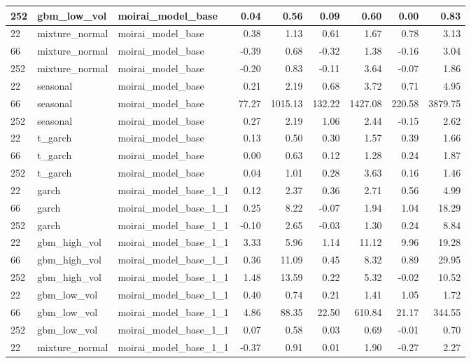 {\begin{tabular}{lllrrrrrr}
252 & gbm\_low\_vol & moirai\_model\_base & 0.04 & 0.56 & 0.09 & 0.60 & 0.00 & 0.83 \\
\midrule
22 & mixture\_normal & moirai\_model\_base & 0.38 & 1.13 & 0.61 & 1.67 & 0.78 & 3.13 \\
66 & mixture\_normal & moirai\_model\_base & -0.39 & 0.68 & -0.32 & 1.38 & -0.16 & 3.04 \\
252 & mixture\_normal & moirai\_model\_base & -0.20 & 0.83 & -0.11 & 3.64 & -0.07 & 1.86 \\
\midrule
22 & seasonal & moirai\_model\_base & 0.21 & 2.19 & 0.68 & 3.72 & 0.71 & 4.95 \\
66 & seasonal & moirai\_model\_base & 77.27 & 1015.13 & 132.22 & 1427.08 & 220.58 & 3879.75 \\
252 & seasonal & moirai\_model\_base & 0.27 & 2.19 & 1.06 & 2.44 & -0.15 & 2.62 \\
\midrule
22 & t\_garch & moirai\_model\_base & 0.13 & 0.50 & 0.30 & 1.57 & 0.39 & 1.66 \\
66 & t\_garch & moirai\_model\_base & 0.00 & 0.63 & 0.12 & 1.28 & 0.24 & 1.87 \\
252 & t\_garch & moirai\_model\_base & 0.04 & 1.01 & 0.28 & 3.63 & 0.16 & 1.46 \\
\midrule
22 & garch & moirai\_model\_base\_1\_1 & 0.12 & 2.37 & 0.36 & 2.71 & 0.56 & 4.99 \\
66 & garch & moirai\_model\_base\_1\_1 & 0.25 & 8.22 & -0.07 & 1.94 & 1.04 & 18.29 \\
252 & garch & moirai\_model\_base\_1\_1 & -0.10 & 2.65 & -0.03 & 1.30 & 0.24 & 8.84 \\
\midrule
22 & gbm\_high\_vol & moirai\_model\_base\_1\_1 & 3.33 & 5.96 & 1.14 & 11.12 & 9.96 & 19.28 \\
66 & gbm\_high\_vol & moirai\_model\_base\_1\_1 & 0.36 & 11.09 & 0.45 & 8.32 & 0.89 & 29.95 \\
252 & gbm\_high\_vol & moirai\_model\_base\_1\_1 & 1.48 & 13.59 & 0.22 & 5.32 & -0.02 & 10.52 \\
\midrule
22 & gbm\_low\_vol & moirai\_model\_base\_1\_1 & 0.40 & 0.74 & 0.21 & 1.41 & 1.05 & 1.72 \\
66 & gbm\_low\_vol & moirai\_model\_base\_1\_1 & 4.86 & 88.35 & 22.50 & 610.84 & 21.17 & 344.55 \\
252 & gbm\_low\_vol & moirai\_model\_base\_1\_1 & 0.07 & 0.58 & 0.03 & 0.69 & -0.01 & 0.70 \\
\midrule
22 & mixture\_normal & moirai\_model\_base\_1\_1 & -0.37 & 0.91 & 0.01 & 1.90 & -0.27 & 2.27 \\

\end{tabular}}
